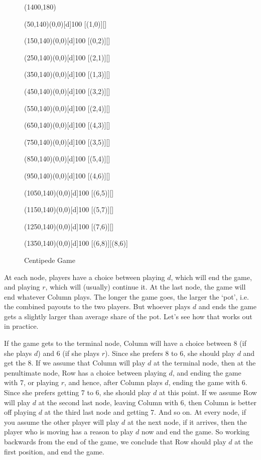 \begin{figure}[htb]
\hspace*{\fill} 
\begin{egame}(1400,180) 

\putbranch(50,140)(0,0)[d]{100} 
[(1,0)][]
 
\putbranch(150,140)(0,0)[d]{100} 
[(0,2)][]
 
\putbranch(250,140)(0,0)[d]{100} 
[(2,1)][]
 
\putbranch(350,140)(0,0)[d]{100} 
[(1,3)][]
 
\putbranch(450,140)(0,0)[d]{100} 
[(3,2)][]
 
\putbranch(550,140)(0,0)[d]{100} 
[(2,4)][]
 
\putbranch(650,140)(0,0)[d]{100} 
[(4,3)][]
 
\putbranch(750,140)(0,0)[d]{100} 
[(3,5)][]

\putbranch(850,140)(0,0)[d]{100} 
[(5,4)][]
 
\putbranch(950,140)(0,0)[d]{100} 
[(4,6)][]
  
\putbranch(1050,140)(0,0)[d]{100} 
[(6,5)][]
 
\putbranch(1150,140)(0,0)[d]{100} 
[(5,7)][]

\putbranch(1250,140)(0,0)[d]{100} 
[(7,6)][]
 
\putbranch(1350,140)(0,0)[d]{100} 
[(6,8)][(8,6)]
 
\end{egame}
\hspace*{\fill} 
\caption[]{Centipede Game}
\label{f:one} 
\end{figure} 

\noindent At each node, players have a choice between playing $d$, which will end the game, and playing $r$, which will (usually) continue it. At the last node, the game will end whatever Column plays. The longer the game goes, the larger the `pot', i.e. the combined payouts to the two players. But whoever plays $d$ and ends the game gets a slightly larger than average share of the pot. Let's see how that works out in practice. 

If the game gets to the terminal node, Column will have a choice between 8 (if she plays $d$) and 6 (if she plays $r$). Since she prefers 8 to 6, she should play $d$ and get the 8. If we assume that Column will play $d$ at the terminal node, then at the penultimate node, Row has a choice between playing $d$, and ending the game with 7, or playing $r$, and hence, after Column plays $d$, ending the game with 6. Since she prefers getting 7 to 6, she should play $d$ at this point. If we assume Row will play $d$ at the second last node, leaving Column with 6, then Column is better off playing $d$ at the third last node and getting 7. And so on. At every node, if you assume the other player will play $d$ at the next node, if it arrives, then the player who is moving has a reason to play $d$ now and end the game. So working backwards from the end of the game, we conclude that Row should play $d$ at the first position, and end the game.

